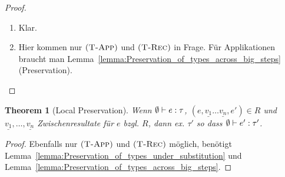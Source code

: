 \documentclass[12pt,a2paper,draft]{article}
\newcommand{\Tj}[3]{\mbox{\ensuremath{{#1}\vdash{#2}:{#3}}}}
\newcommand{\tj}[2]{\Tj{\emptyset}{#1}{#2}}
\newcommand{\rn}[1]{\mbox{\ensuremath{\textsc{(#1)}}}}
\newtheorem{theorem}{Theorem}
\begin{document}
\begin{proof} \
  \begin{enumerate}
  \item Klar.
  \item Hier kommen nur \rn{T-App} und \rn{T-Rec} in Frage. F\"ur Applikationen braucht man
    Lemma~\ref{lemma:Preservation_of_types_across_big_steps} (Preservation).
  \end{enumerate}
\end{proof}

\begin{theorem}[Local Preservation]
  Wenn $\tj{e}{\tau}$, $(e,\underline{v_1}\ldots\underline{v_n},e') \in R$ und
  $\underline{v_1},\ldots,\underline{v_n}$ Zwischenresultate f\"ur $e$ bzgl. $R$, dann
  ex. $\tau'$ so dass $\tj{e'}{\tau'}$.
\end{theorem}

\begin{proof}
  Ebenfalls nur \rn{T-App} und \rn{T-Rec} m\"oglich, ben\"otigt
  Lemma~\ref{lemma:Preservation_of_types_under_substitution}
  und Lemma~\ref{lemma:Preservation_of_types_across_big_steps}.
\end{proof}




\end{document}
